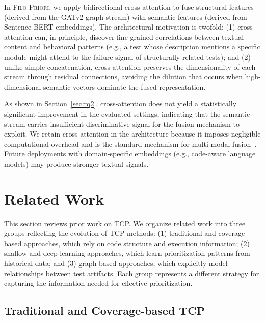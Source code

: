 \documentclass[10pt,journal,compsoc]{IEEEtran}
\newcommand{\filopriori}{\textsc{Filo-Priori}}
\begin{document}
In \filopriori{}, we apply bidirectional cross-attention to fuse structural
features (derived from the GATv2 graph stream) with semantic features
(derived from Sentence-BERT embeddings). The architectural motivation is
twofold: (1) cross-attention can, in principle, discover fine-grained
correlations between textual content and behavioral patterns (e.g., a test
whose description mentions a specific module might attend to the failure
signal of structurally related tests); and (2) unlike simple concatenation,
cross-attention preserves the dimensionality of each stream through residual
connections, avoiding the dilution that occurs when high-dimensional
semantic vectors dominate the fused representation.

As shown in Section~\ref{sec:rq2}, cross-attention does not yield a
statistically significant improvement in the evaluated settings, indicating
that the semantic stream carries insufficient discriminative signal for the
fusion mechanism to exploit. We retain cross-attention in the architecture
because it imposes negligible computational overhead and is the standard
mechanism for multi-modal fusion~\cite{vaswani2017attention,
wu2021comprehensive}. Future deployments with domain-specific embeddings
(e.g., code-aware language models) may produce stronger textual signals.

\section{Related Work}
\label{sec:related}

This section reviews prior work on TCP. We organize related work into three
groups reflecting the evolution of TCP methods: (1) traditional and coverage-based
approaches, which rely on code structure and execution information;
(2) shallow and deep learning approaches, which learn prioritization
patterns from historical data; and (3) graph-based approaches, which explicitly
model relationships between test artifacts. Each group represents a different
strategy for capturing the information needed for effective prioritization.

\subsection{Traditional and Coverage-based TCP}
\end{document}
